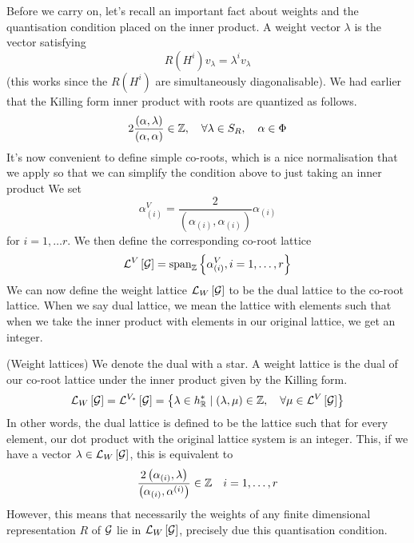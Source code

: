  Before we carry on, let's recall an important fact about weights 
 and the quantisation condition placed on the inner product. 
 A weight vector $ \lambda $  is the vector satisfying 
 \[
  R \left( H ^ i  \right)  v_{ \lambda}  = \lambda ^ i v_{ \lambda } 
 \]  (this works since the $ R \left( H ^ i \right)   $ are simultaneously diagonalisable). 
 We had earlier that the Killing form inner product with roots are 
 quantized as follows. 
 \[
	 2 \frac{ \left( \alpha , \lambda  \right)  }{ \left( \alpha , \alpha  \right)  } \in \mathbb{Z} , 
	 \quad \forall \lambda \in S _ R, \quad \alpha \in \Phi  
 \] 
 It's now convenient to define simple co-roots, 
 which is a nice normalisation that we apply so that we 
 can simplify the condition above to just taking an inner product We set 
 \[
	 \alpha^ V _{ \left( i  \right)  }  = \frac{2}{\left( \alpha_{\left( i  \right)  } , \alpha _{\left( i  \right)  } \right)  } \alpha_{ \left( i  \right) }
 \] for $ i = 1, \dots r $. 
 We then define the corresponding co-root lattice 
 \[
	 \mathcal{ L } ^ V \left[  \mathcal{ G }  \right]   = \text{span}_{ \mathbb{ Z } } \left\{  
	 \alpha _{ \left( i  \right)  }^ V , i  = 1 , \dots, r \right\} 
 \] We can now define the weight lattice $\mathcal{ L } _ W \left[  \mathcal{ G }  \right]  $  
 to be the dual lattice to the co-root lattice. When we say dual lattice, 
 we mean the lattice with elements such that when we take the 
 inner product with elements in our original lattice, we get an integer. 

 \begin{defn}{(Weight lattices)}
 We denote the dual with a star.
 A weight lattice is the dual of our 
 co-root lattice under the inner product 
 given by the Killing form. 
 \[
  \mathcal{ L } _ W \left[  \mathcal{ G }  \right]  
   =  \mathcal{L  } ^{ V _ * } \left[  \mathcal{ G }  \right]   = 
   \left\{  \lambda \in h _{ \mathbb{R}  } ^ * \mid \left( \lambda , \mu  \right)  \in \mathbb{Z} , \quad 
   \forall \mu \in \mathcal{ L } ^ V \left[  \mathcal{ G }  \right]  \right\}  
 \] In other words, the dual lattice 
 is defined to be the lattice such that 
 for every element, our dot product with 
 the original lattice system is an integer. 
 This, if we have a vector $ \lambda \in \mathcal{ L } _W \left[  \mathcal{ G }  \right]  $, 
 this is equivalent to 
 \[
	 \frac{ 2 \left( \alpha _{ \left( i  \right)  } , \lambda  \right)  }{ 
	 \left( \alpha _{ \left( i  \right)  } , \alpha ^{ \left( i  \right)   }  \right)  } \in \mathbb{Z} \quad 
	 i = 1 , \dots ,r
 \] However, this means that necessarily the weights 
 of any finite dimensional representation $ R $ of 
 $ \mathcal{ G } $ lie in $ \mathcal{ L } _ W  \left[  \mathcal{ G }  \right]  $, 
 precisely due this quantisation condition. 	
 \end{defn}

